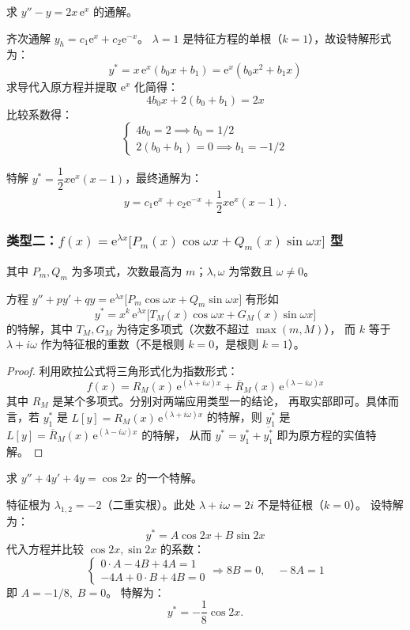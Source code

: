 \documentclass[lang=cn,11pt]{elegantbook}
\begin{document}
\begin{exercise}
求 $y''-y=2x\,\mathrm{e}^{x}$ 的通解。
\end{exercise}
\begin{solution}
齐次通解 $y_h=c_1\mathrm{e}^x+c_2\mathrm{e}^{-x}$。
$\lambda=1$ 是特征方程的单根（$k=1$），故设特解形式为：
\[
y^*=x\,\mathrm{e}^x(b_0x+b_1) = \mathrm{e}^x(b_0 x^2 + b_1 x)
\]
求导代入原方程并提取 $\mathrm{e}^x$ 化简得：
\[
4b_0x+2(b_0+b_1)=2x
\]
比较系数得：
\[
\begin{cases}
4b_0 = 2 \implies b_0 = 1/2 \\
2(b_0+b_1) = 0 \implies b_1 = -1/2
\end{cases}
\]

特解 $y^*=\dfrac12 x\mathrm{e}^x(x-1)$，最终通解为：
\[
\boxed{y=c_1\mathrm{e}^x+c_2\mathrm{e}^{-x}+\frac12 x\mathrm{e}^x(x-1)}.
\]
\end{solution}


\subsubsection{类型二：$f(x)=\mathrm{e}^{\lambda x}\bigl[P_m(x)\cos\omega x+Q_m(x)\sin\omega x\bigr]$ 型}

其中 $P_m,Q_m$ 为多项式，次数最高为 $m$；$\lambda,\omega$ 为常数且 $\omega \neq 0$。

\begin{theorem}[比较系数法的特解形式 II] \label{thm:undetermined-coefficients-type2}
方程 $y''+py'+qy=\mathrm{e}^{\lambda x}\bigl[P_m\cos\omega x+Q_m\sin\omega x\bigr]$
有形如
\[
y^*=x^k\,\mathrm{e}^{\lambda x}\bigl[T_M(x)\cos\omega x+G_M(x)\sin\omega x\bigr]
\]
的特解，其中 $T_M,G_M$ 为待定多项式（次数不超过 $\max(m,M)$），
而 $k$ 等于 $\lambda+i\omega$ 作为特征根的重数（不是根则 $k=0$，是根则 $k=1$）。
\end{theorem}

\begin{proof}
    利用欧拉公式将三角形式化为指数形式：
\[f(x)=R_M(x)\,\mathrm{e}^{(\lambda+i\omega)x}+\overline{R}_M(x)\,\mathrm{e}^{(\lambda-i\omega)x}\]
其中 $R_M$ 是某个多项式。分别对两端应用类型一的结论，
再取实部即可。具体而言，若 $y_1^*$ 是
$L[y]=R_M(x)\,\mathrm{e}^{(\lambda+i\omega)x}$ 的特解，则 $\overline{y_1^*}$ 是
$L[y]=\overline{R}_M(x)\,\mathrm{e}^{(\lambda-i\omega)x}$ 的特解，
从而 $y^*=y_1^*+\overline{y_1^*}$ 即为原方程的实值特解。
\end{proof}

\begin{exercise}
求 $y''+4y'+4y=\cos 2x$ 的一个特解。
\end{exercise}
\begin{solution}
特征根为 $\lambda_{1,2}=-2$（二重实根）。此处 $\lambda+i\omega=2i$ 不是特征根（$k=0$）。
设特解为：
\[
y^*=A\cos 2x+B\sin 2x
\]
代入方程并比较 $\cos 2x,\sin 2x$ 的系数：
\[
\begin{cases}
0\cdot A-4B+4A=1\\
-4A+0\cdot B+4B=0
\end{cases}
\Longrightarrow 8B=0,\quad -8A=1
\]
即 $A=-1/8,\;B=0$。
特解为：
\[
\boxed{y^*=-\frac18\cos 2x}.
\]
\end{solution}
\end{document}
